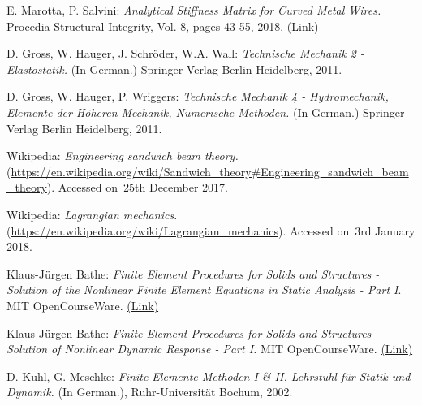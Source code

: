\begin{thebibliography}{99}
 E. Marotta, P. Salvini: \textit{Analytical Stiffness Matrix for Curved Metal Wires.} Procedia Structural Integrity, Vol. 8, pages 43-55, 2018. \href{https://www.sciencedirect.com/science/article/pii/S2452321617305000/pdf?md5=976b080cb40aa72bdc62a081d098b4dc&pid=1-s2.0-S2452321617305000-main.pdf}{(\underline{Link})}

 D. Gross, W. Hauger, J. Schr{\"o}der, W.A. Wall: \textit{Technische Mechanik 2 - Elastostatik.} (In German.) Springer-Verlag Berlin Heidelberg, 2011.

 D. Gross, W. Hauger, P. Wriggers: \textit{Technische Mechanik 4 - Hydromechanik, Elemente der H{\"o}heren Mechanik, Numerische Methoden.} (In German.) Springer-Verlag Berlin Heidelberg, 2011.

 Wikipedia: \textit{Engineering sandwich beam theory.} (\url{https://en.wikipedia.org/wiki/Sandwich_theory#Engineering_sandwich_beam_theory}). Accessed on~25th December 2017.

 Wikipedia: \textit{Lagrangian mechanics.} (\url{https://en.wikipedia.org/wiki/Lagrangian_mechanics}). Accessed on~3rd January 2018.


 Klaus-J{\"u}rgen Bathe: \textit{Finite Element Procedures for Solids and Structures - Solution of the Nonlinear Finite Element Equations in Static Analysis - Part I}. MIT OpenCourseWare. \href{http://ocw.mit.edu/resources/res-2-002-finite-element-procedures-for-solids-and-structures-spring-2010/nonlinear/lecture-10/MITRES2_002S10_lec10.pdf}{(\underline{Link})}

 Klaus-J{\"u}rgen Bathe: \textit{Finite Element Procedures for Solids and Structures - Solution of Nonlinear Dynamic Response - Part I.} MIT OpenCourseWare. \href{http://ocw.mit.edu/resources/res-2-002-finite-element-procedures-for-solids-and-structures-spring-2010/nonlinear/lecture-13/MITRES2_002S10_lec13.pdf}{(\underline{Link})}

 D. Kuhl, G. Meschke: \textit{Finite Elemente Methoden I \& II. Lehrstuhl f{\"u}r Statik und Dynamik.} (In German.), Ruhr-Universit{\"a}t Bochum, 2002.


\end{thebibliography}
